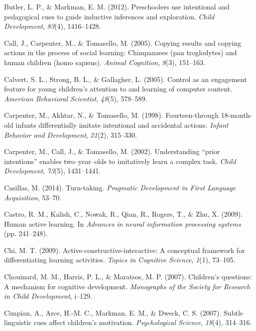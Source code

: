 \documentclass[english,man]{apa6}
\theoremstyle{definition}
\theoremstyle{definition}
\theoremstyle{definition}
\theoremstyle{remark}
\begin{document}
\hypertarget{ref-butler2012preschoolers}{}
Butler, L. P., \& Markman, E. M. (2012). Preschoolers use intentional
and pedagogical cues to guide inductive inferences and exploration.
\emph{Child Development}, \emph{83}(4), 1416--1428.

\hypertarget{ref-call2005copying}{}
Call, J., Carpenter, M., \& Tomasello, M. (2005). Copying results and
copying actions in the process of social learning: Chimpanzees (pan
troglodytes) and human children (homo sapiens). \emph{Animal Cognition},
\emph{8}(3), 151--163.

\hypertarget{ref-calvert2005control}{}
Calvert, S. L., Strong, B. L., \& Gallagher, L. (2005). Control as an
engagement feature for young children's attention to and learning of
computer content. \emph{American Behavioral Scientist}, \emph{48}(5),
578--589.

\hypertarget{ref-carpenter1998fourteen}{}
Carpenter, M., Akhtar, N., \& Tomasello, M. (1998). Fourteen-through
18-month-old infants differentially imitate intentional and accidental
actions. \emph{Infant Behavior and Development}, \emph{21}(2), 315--330.

\hypertarget{ref-carpenter2002understanding}{}
Carpenter, M., Call, J., \& Tomasello, M. (2002). Understanding ``prior
intentions'' enables two--year--olds to imitatively learn a complex
task. \emph{Child Development}, \emph{73}(5), 1431--1441.

\hypertarget{ref-casillas2014turn}{}
Casillas, M. (2014). Turn-taking. \emph{Pragmatic Development in First
Language Acquisition}, 53--70.

\hypertarget{ref-castro2009human}{}
Castro, R. M., Kalish, C., Nowak, R., Qian, R., Rogers, T., \& Zhu, X.
(2009). Human active learning. In \emph{Advances in neural information
processing systems} (pp. 241--248).

\hypertarget{ref-chi2009active}{}
Chi, M. T. (2009). Active-constructive-interactive: A conceptual
framework for differentiating learning activities. \emph{Topics in
Cognitive Science}, \emph{1}(1), 73--105.

\hypertarget{ref-chouinard2007children}{}
Chouinard, M. M., Harris, P. L., \& Maratsos, M. P. (2007). Children's
questions: A mechanism for cognitive development. \emph{Monographs of
the Society for Research in Child Development}, i--129.

\hypertarget{ref-cimpian2007subtle}{}
Cimpian, A., Arce, H.-M. C., Markman, E. M., \& Dweck, C. S. (2007).
Subtle linguistic cues affect children's motivation. \emph{Psychological
Science}, \emph{18}(4), 314--316.
\end{document}
